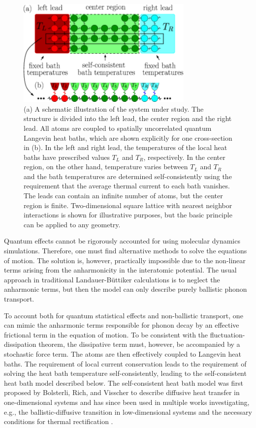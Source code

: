 \begin{figure}
\begin{center}
 \includegraphics[width=8.6cm]{pics/pic_scbaths.pdf}
 \caption{(a) A schematic illustration of the system under study. The structure is divided into the left lead, the center region and the right lead. All atoms are coupled to spatially uncorrelated quantum Langevin heat baths, which are shown explicitly for one cross-section in (b). In the left and right lead, the temperatures of the local heat baths have prescribed values $T_L$ and $T_R$, respectively. In the center region, on the other hand, temperature varies between $T_L$ and $T_R$ and the bath temperatures are determined self-consistently using the requirement that the average thermal current to each bath vanishes. The leads can contain an infinite number of atoms, but the center region is finite. Two-dimensional square lattice with nearest neighbor interactions is shown for illustrative purposes, but the basic principle can be applied to any geometry.}
\label{fig:sud1}
\end{center}
\end{figure}

Quantum effects cannot be rigorously accounted for using molecular dynamics simulations. Therefore, one must find alternative methods to solve the equations of motion. The solution is, however, practically impossible due to the non-linear terms arising from the anharmonicity in the interatomic potential. The usual approach in traditional Landauer-B\"uttiker calculations \cite{zhang07} is to neglect the anharmonic terms, but then the model can only describe purely ballistic phonon transport. 

To account both for quantum statistical effects and non-ballistic transport, one can mimic the anharmonic terms responsible for phonon decay by an effective frictional term in the equation of motion. To be consistent with the fluctuation-dissipation theorem, the dissipative term must, however, be accompanied by a stochastic force term. The atoms are then effectively coupled to Langevin heat baths. The requirement of local current conservation leads to the requirement of solving the heat bath temperature self-consistently, leading to the self-consistent heat bath model described below. The self-consistent heat bath model was first proposed by Bolsterli, Rich, and Visscher to describe diffusive heat transfer in one-dimensional systems \cite{bolsterli70} and has since been used in multiple works investigating, e.g., the ballistic-diffusive transition in low-dimensional systems \cite{bonetto04,dhar06,roy08} and the necessary conditions for thermal rectification \cite{pereira08,segal09,bandyopadhyay11}.

